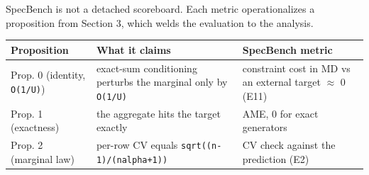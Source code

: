 SpecBench is not a detached scoreboard. Each metric operationalizes a
proposition from Section 3, which welds the evaluation to the analysis.

\begin{longtable}[]{@{}lll@{}}
\toprule
\begin{minipage}[b]{0.30\columnwidth}\raggedright
Proposition\strut
\end{minipage} & \begin{minipage}[b]{0.30\columnwidth}\raggedright
What it claims\strut
\end{minipage} & \begin{minipage}[b]{0.30\columnwidth}\raggedright
SpecBench metric\strut
\end{minipage}\tabularnewline
\midrule
\endhead
\begin{minipage}[t]{0.30\columnwidth}\raggedright
Prop. 0 (identity, \texttt{O(1/\allowbreak{}U)})\strut
\end{minipage} & \begin{minipage}[t]{0.30\columnwidth}\raggedright
exact-sum conditioning perturbs the marginal only by
\texttt{O(1/\allowbreak{}U)}\strut
\end{minipage} & \begin{minipage}[t]{0.30\columnwidth}\raggedright
constraint cost in MD vs an external target \ensuremath{\approx} 0
(E11)\strut
\end{minipage}\tabularnewline
\begin{minipage}[t]{0.30\columnwidth}\raggedright
Prop. 1 (exactness)\strut
\end{minipage} & \begin{minipage}[t]{0.30\columnwidth}\raggedright
the aggregate hits the target exactly\strut
\end{minipage} & \begin{minipage}[t]{0.30\columnwidth}\raggedright
AME, 0 for exact generators\strut
\end{minipage}\tabularnewline
\begin{minipage}[t]{0.30\columnwidth}\raggedright
Prop. 2 (marginal law)\strut
\end{minipage} & \begin{minipage}[t]{0.30\columnwidth}\raggedright
per-row CV equals \texttt{sqrt((n-1)/\allowbreak{}(nalpha+1))}\strut
\end{minipage} & \begin{minipage}[t]{0.30\columnwidth}\raggedright
CV check against the prediction (E2)\strut
\end{minipage}\tabularnewline

\end{longtable}
